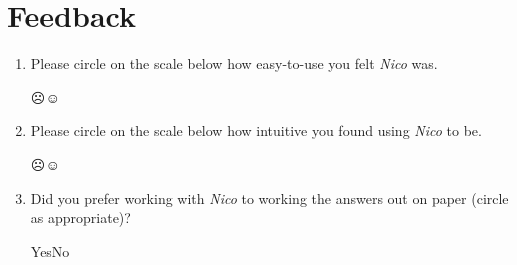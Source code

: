 \documentclass[14pt]{article}
\begin{document}
\section*{Feedback}




\begin{enumerate}

\item Please circle on the scale below how easy-to-use you felt \emph{Nico}
was.

\begin{center}
{\Huge \vspace{-0.5cm}☹\hspace{0.25cm}{\bf ·}\hspace{0.25cm}{\bf ·}\hspace{0.25cm}{\bf ·}\hspace{0.25cm}☺\\}
\end{center}

\item Please circle on the scale below how intuitive you found using \emph{Nico}
to be.

\begin{center}
{\Huge \vspace{-0.5cm}☹\hspace{0.25cm}{\bf ·}\hspace{0.25cm}{\bf ·}\hspace{0.25cm}{\bf ·}\hspace{0.25cm}☺\\}

\end{center}

\pagebreak

\item Did you prefer working with \emph{Nico} to working the answers out on
paper (circle as appropriate)?

\begin{center}
Yes\hspace{1cm}No\\
\end{center}

\\


\end{enumerate}
\end{document}

